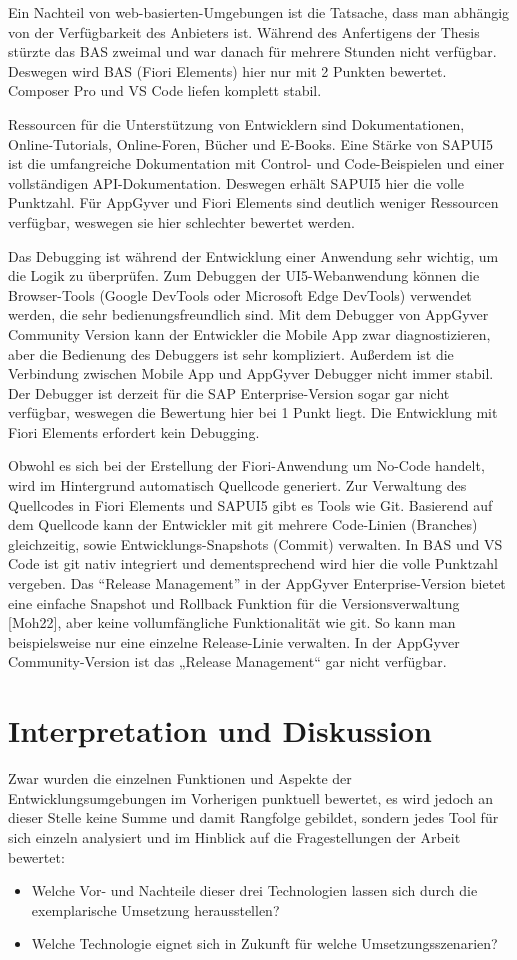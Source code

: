 Ein Nachteil von web-basierten-Umgebungen ist die Tatsache, dass man abhängig von der Verfügbarkeit des Anbieters ist. Während des Anfertigens der Thesis stürzte das BAS zweimal und war danach für mehrere Stunden nicht verfügbar. Deswegen wird BAS (Fiori Elements) hier nur mit 2 Punkten bewertet. Composer Pro und VS Code liefen komplett stabil.

Ressourcen für die Unterstützung von Entwicklern sind Dokumentationen, Online-Tutorials, Online-Foren, Bücher und E-Books. Eine Stärke von SAPUI5 ist die umfangreiche Dokumentation mit Control- und Code-Beispielen und einer vollständigen API-Dokumentation. Deswegen erhält SAPUI5 hier die volle Punktzahl. Für AppGyver und Fiori Elements sind deutlich weniger Ressourcen verfügbar, weswegen sie hier schlechter bewertet werden.

Das Debugging ist während der Entwicklung einer Anwendung sehr wichtig, um die Logik zu überprüfen. Zum Debuggen der UI5-Webanwendung können die Browser-Tools (Google DevTools oder Microsoft Edge DevTools) verwendet werden, die sehr bedienungsfreundlich sind. Mit dem Debugger von AppGyver Community Version kann der Entwickler die Mobile App zwar diagnostizieren, aber die Bedienung des Debuggers ist sehr kompliziert. Außerdem ist die Verbindung zwischen Mobile App und AppGyver Debugger nicht immer stabil. Der Debugger ist derzeit für die SAP Enterprise-Version sogar gar nicht verfügbar, weswegen die Bewertung hier bei 1 Punkt liegt. Die Entwicklung mit Fiori Elements erfordert kein Debugging.

Obwohl es sich bei der Erstellung der Fiori-Anwendung um No-Code handelt, wird im Hintergrund automatisch Quellcode generiert. Zur Verwaltung des Quellcodes in Fiori Elements und SAPUI5 gibt es Tools wie Git. Basierend auf dem Quellcode kann der Entwickler mit git mehrere Code-Linien (Branches) gleichzeitig, sowie Entwicklungs-Snapshots (Commit) verwalten. In BAS und VS Code ist git nativ integriert und dementsprechend wird hier die volle Punktzahl vergeben. Das “Release Management” in der AppGyver Enterprise-Version bietet eine einfache Snapshot und Rollback Funktion für die Versionsverwaltung [Moh22], aber keine vollumfängliche Funktionalität wie git. So kann man beispielsweise nur eine einzelne Release-Linie verwalten. In der AppGyver Community-Version ist das „Release Management“ gar nicht verfügbar. 

\section{Interpretation und Diskussion}
Zwar wurden die einzelnen Funktionen und Aspekte der Entwicklungsumgebungen im Vorherigen punktuell bewertet, es wird jedoch an dieser Stelle keine Summe und damit Rangfolge gebildet, sondern jedes Tool für sich einzeln analysiert und im Hinblick auf die Fragestellungen der Arbeit bewertet:
\begin{itemize}[noitemsep]
\item Welche Vor- und Nachteile dieser drei Technologien lassen sich durch die exemplarische Umsetzung herausstellen? 
\item Welche Technologie eignet sich in Zukunft für welche Umsetzungsszenarien?
\end{itemize}

